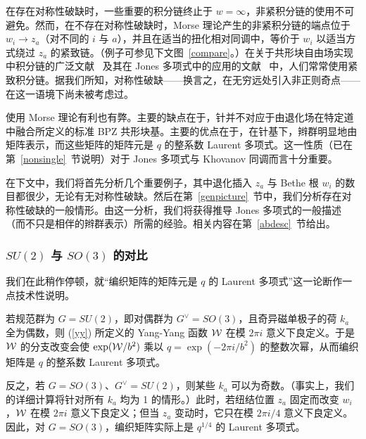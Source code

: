 在存在对称性破缺时，一些重要的积分链终止于 $w=\infty$，非紧积分链的使用不可避免。然而，在不存在对称性破缺时，Morse 理论产生的非紧积分链的端点位于 $w_i\to z_a$（对不同的 $i$ 与 $a$），并且在适当的扭化相对同调中，等价于 $w_i$ 以适当方式绕过 $z_a$ 的紧致链。（例子可参见下文图~\ref{compare}。）在关于共形块自由场实现中积分链的广泛文献~\cite{DF,Felder} 及其在 Jones 多项式中的应用的文献~\cite{Lawrence,SV} 中，人们常常使用紧致积分链。据我们所知，对称性破缺——换言之，在无穷远处引入非正则奇点——在这一语境下尚未被考虑过。

使用 Morse 理论有利也有弊。主要的缺点在于，针并不对应于由退化场在特定道中融合所定义的标准 BPZ 共形块基。主要的优点在于，在针基下，辫群明显地由矩阵表示，而这些矩阵的矩阵元是 $q$ 的整系数 Laurent 多项式。这一性质（已在第~\ref{nonsingle}~节说明）对于 Jones 多项式与 Khovanov 同调而言十分重要。

在下文中，我们将首先分析几个重要例子，其中退化插入 $z_a$ 与 Bethe 根 $w_i$ 的数目都很少，无论有无对称性破缺。然后在第~\ref{genpicture}~节中，我们分析存在对称性破缺的一般情形。由这一分析，我们将获得推导 Jones 多项式的一般描述（而不只是相伴的辫群表示）所需的经验。相关内容在第~\ref{abdesc}~节给出。

\subsubsection{$SU(2)$ 与 $SO(3)$ 的对比}\label{contrast}

我们在此稍作停顿，就“编织矩阵的矩阵元是 $q$ 的 Laurent 多项式”这一论断作一点技术性说明。

若规范群为 $G=SU(2)$，即对偶群为 $G^\vee=SO(3)$，且奇异磁单极子的荷 $k_a$ 全为偶数，则 (\ref{yy}) 所定义的 Yang-Yang 函数 ${\mathcal W}$ 在模 $2\pi i$ 意义下良定义。于是 ${\mathcal W}$ 的分支改变会使 $\exp({\mathcal W}/b^2)$ 乘以 $q=\exp(-2\pi i/b^2)$ 的整数次幂，从而编织矩阵是 $q$ 的整系数 Laurent 多项式。

反之，若 $G=SO(3)$、$G^\vee=SU(2)$，则某些 $k_a$ 可以为奇数。（事实上，我们的详细计算将针对所有 $k_a$ 均为 1 的情形。）此时，若纽结位置 $z_a$ 固定而改变 $w_i$，${\mathcal W}$ 在模 $2\pi i$ 意义下良定义；但当 $z_a$ 变动时，它只在模 $2\pi i/4$ 意义下良定义。因此，对 $G=SO(3)$，编织矩阵实际上是 $q^{1/4}$ 的 Laurent 多项式。


